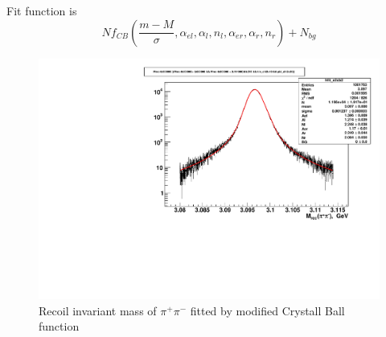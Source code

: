 \documentclass[a4paper,12pt]{article}
\begin{document}
Fit function is
\begin{equation}
N f_{CB}\left( \frac{m - M}{\sigma},  \alpha_{el},\alpha_{l}, n_l,  \alpha_{er}, \alpha_r,  n_r\right)  +  N_{bg}
\end{equation}








\begin{figure}
	\includegraphics[width=\textwidth]{fig/Mrec_fit_double_exp_double_crystal_ball.pdf}
	\caption{Recoil invariant mass of $\pi^+\pi^-$ fitted by 
		modified Crystall Ball function}
\end{figure}
\end{document}
